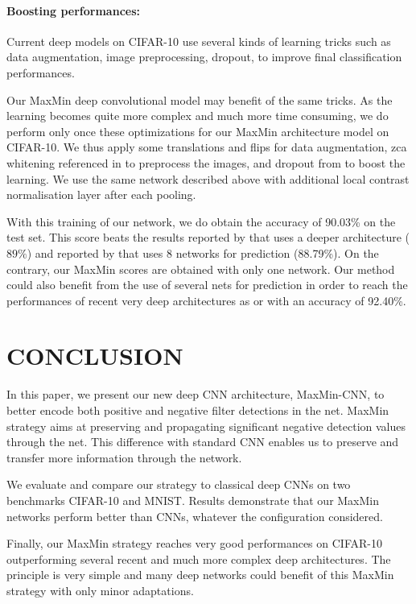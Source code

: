 \documentclass{article}
\begin{document}
\paragraph*{Boosting performances:}
Current deep models on CIFAR-10 use several kinds of learning tricks such as data augmentation, image preprocessing, dropout, to improve final classification performances. 

Our MaxMin deep convolutional model may benefit of the same tricks. As the learning becomes quite more complex and much more time consuming, we do perform only once these optimizations for our MaxMin architecture model on CIFAR-10. We thus apply some translations and flips for data augmentation, zca whitening referenced in \cite{zca} to preprocess the images, and dropout from \cite{dropout} to boost the learning. We use the same network described above with additional local contrast normalisation layer after each pooling. %

With this training of our network, we do obtain the accuracy of 90.03\% on the test set.  This score beats the results reported by \cite{alexnet} that uses a deeper architecture ($89\%$) and reported by \cite{multicolumn} that uses 8 networks for prediction (88.79\%). On the contrary, our MaxMin scores are obtained with only one network. Our method could also benefit from the use of several nets for prediction in order to reach the performances of  recent very deep architectures as \cite{cif1} or \cite{cif2} with an accuracy of 92.40\%. 

\section{CONCLUSION}
\label{sec:majhead}
In this paper, we  present our new deep CNN architecture, MaxMin-CNN, to better encode both positive and negative filter detections in the net. MaxMin strategy aims at preserving and propagating significant negative detection values through the net. This difference with standard CNN enables us  to preserve and transfer more information through the network. 

We  evaluate and compare our strategy to classical deep CNNs on two benchmarks CIFAR-10 and MNIST. 
Results demonstrate that our MaxMin networks perform better than CNNs, whatever the configuration considered.

Finally, our MaxMin strategy reaches very good performances on CIFAR-10 outperforming several recent and much more complex deep architectures. The principle is very simple and many deep  networks could benefit of this MaxMin strategy with only minor adaptations.  
\end{document}
